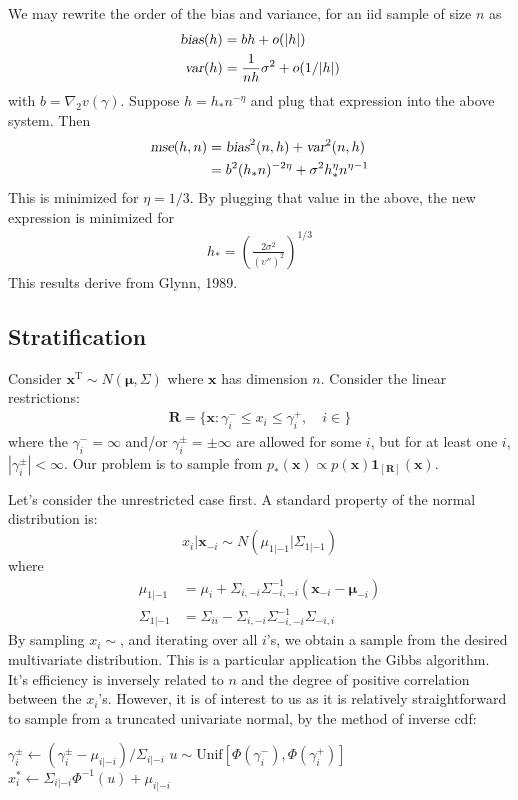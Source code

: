 \documentclass[11pt]{article}
\begin{document}
We may rewrite the order of the bias and variance, for an iid sample
of size $n$ as
\begin{align}
\textsl{bias}(h)& = b h+o(|h|)\\
\textsl{var}(h)& = \frac{1}{n h}\sigma^2 +o(1/|h|)
\end{align}with $b=\nabla_2 v(\gamma)$. Suppose $h=h_* n^{-\eta}$
and plug that expression into the above system. Then
\begin{align}
\textsl{mse}(h,n)&=\textsl{bias}^2(n,h)+\textsl{var}^2(n,h)\\
&=b^2 (h_* n)^{-2\eta}+\sigma^2 h_*^{\eta}n^{\eta-1}
\end{align}This is minimized for $\eta=1/3$. By plugging that value
in the above, the new expression is minimized for
\begin{align}
h_*=\left(\frac{2\sigma^2}{(\upsilon'')^2}\right)^{1/3}
\end{align}This results derive from Glynn, 1989.

\subsection{Stratification}
Consider $\mathbf{x}^{\mathrm{T}}\sim N(\boldsymbol{\mu},\Sigma)$
where $\mathbf{x}$ has dimension $n$. Consider the linear
restrictions:
\begin{align}
\mathbf{R}=\{\mathbf{x}:\gamma_i^{-}\leq x_i \leq
\gamma_{i}^{+},\quad i\in \}
\end{align}where the $\gamma_i^{-}=\infty$ and/or
$\gamma_i^{\pm}=\pm\infty$ are allowed for some $i$, but for at
least one $i$, $|\gamma_i^{\pm}|<\infty$. Our problem is to sample
from $p_*(\mathbf{x})\propto
p(\mathbf{x})\boldsymbol{1}_{[\mathbf{R}]}(\mathbf{x})$.

Let's consider the unrestricted case first. A standard property of
the normal distribution is:
\begin{equation}
x_i|\mathbf{x}_{-i}\sim N(\mu_{1|-1}|\Sigma_{1|-1})
\end{equation}where
\begin{align}
\mu_{1|-1}&=\mu_i+\Sigma_{i,- i}\Sigma_{-i,-i}^{-1}(\mathbf{x}_{-
i}-\boldsymbol{\mu}_{-i})\\ \Sigma_{1|-1}&=\Sigma_{ii}-\Sigma_{i,-
i}\Sigma_{-i,-i}^{-1}\Sigma_{-i,i}
\end{align}
By sampling $x_i\sim $, and iterating over all $i$'s, we obtain a
sample from the desired multivariate distribution. This is a
particular application the Gibbs algorithm. It's efficiency is
inversely related to $n$ and the degree of positive correlation
between the $x_i$'s. However, it is of interest to us as it is
relatively straightforward to sample from a truncated univariate
normal, by the method of inverse cdf:
\begin{algorithmic}
\STATE $\gamma_i^{\pm}\leftarrow
(\gamma_i^{\pm}-\mu_{i|-i})/\Sigma_{i|-i}$ \STATE
$u\sim\mathrm{Unif}[\Phi(\gamma_i^{-}),\Phi(\gamma_i^{+})]$ \STATE $
x_i^*\leftarrow \Sigma_{i|-i}\Phi^{-1}(u)+\mu_{i|-i}$
\end{algorithmic}
\end{document}
